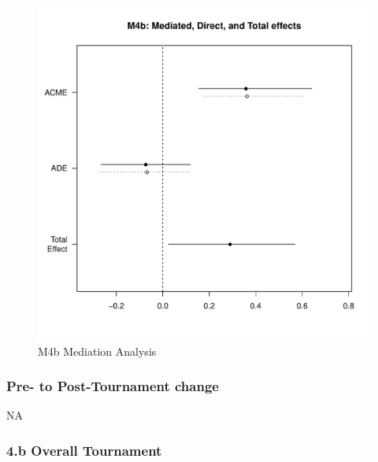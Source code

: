 \begin{landscape}
  \begin{figure}[htbp]
    \centering
    \includegraphics[scale = .5]{images/MLM4bMediationEffects.pdf}
    \caption{M4b Mediation Analysis}
    \label{fig:MLM4bMediationAnalysis}
  \end{figure}


    \subsubsection{Pre- to Post-Tournament change}
    NA


    \subsubsection{4.b Overall Tournament}



\end{landscape}
